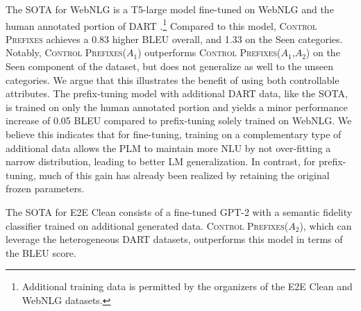 \documentclass[11pt]{article}
\newcommand{\control}{\textsc{Control Prefixes}\xspace}
\begin{document}
The SOTA for WebNLG is a T5-large model fine-tuned on WebNLG and the human annotated portion of DART \citep{dart}.\footnote{Additional training data is permitted by the organizers of the E2E Clean and WebNLG datasets.} Compared to this model, \control achieves a 0.83 higher BLEU overall, and 1.33 on the Seen categories. Notably, \control ($A_1$) outperforms
\control ($A_1$,$A_2$) on the Seen component of the dataset, but does not
generalize as well to the unseen categories. We argue that this illustrates the benefit of using both controllable attributes. The prefix-tuning model with additional DART data, like the SOTA, is trained on only the human annotated portion and yields a minor performance increase of 0.05 BLEU compared to prefix-tuning solely trained on WebNLG. We believe this indicates that for fine-tuning, training on a complementary type of additional data allows the PLM to maintain more NLU by not over-fitting a narrow distribution, leading to better LM generalization. In contrast, for prefix-tuning, much of this gain has already been realized by retaining the original frozen  parameters.


The SOTA \citep{dataturner} for E2E Clean consists of a fine-tuned GPT-2 with a semantic fidelity classifier trained on additional generated data. 
\control ($A_2$), which can leverage the heterogeneous DART datasets, outperforms this model in terms of the BLEU score.
\end{document}
